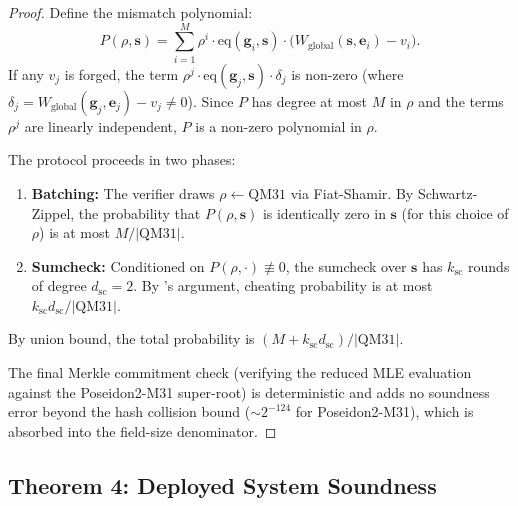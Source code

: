 \documentclass[10pt,twocolumn]{article}
\theoremstyle{definition}
\theoremstyle{remark}
\newcommand{\QM}{\mathrm{QM31}}
\newcommand{\eq}{\mathrm{eq}}
\begin{document}
\begin{proof}
  Define the mismatch polynomial:
  \[
    P(\rho, \mathbf{s}) = \sum_{i=1}^{M} \rho^i
    \cdot \eq(\mathbf{g}_i, \mathbf{s})
    \cdot \bigl(W_{\text{global}}(\mathbf{s}, \mathbf{e}_i)
    - v_i\bigr).
  \]
  If any $v_j$ is forged, the term $\rho^j \cdot
  \eq(\mathbf{g}_j, \mathbf{s}) \cdot \delta_j$ is non-zero
  (where $\delta_j = W_{\text{global}}(\mathbf{g}_j,
  \mathbf{e}_j) - v_j \ne 0$).
  Since $P$ has degree at most $M$ in $\rho$ and the terms
  $\rho^j$ are linearly independent, $P$ is a non-zero
  polynomial in $\rho$.

  The protocol proceeds in two phases:
  \begin{enumerate}[nosep,leftmargin=1.4em]
    \item \textbf{Batching:} The verifier draws
          $\rho \leftarrow \QM$ via Fiat-Shamir.
          By Schwartz-Zippel, the probability that $P(\rho,
          \mathbf{s})$ is identically zero in $\mathbf{s}$
          (for this choice of $\rho$) is at most $M/|\QM|$.
    \item \textbf{Sumcheck:} Conditioned on $P(\rho, \cdot)
          \not\equiv 0$, the sumcheck over $\mathbf{s}$ has
          $k_{\text{sc}}$ rounds of degree $d_{\text{sc}} = 2$.
          By 's argument, cheating
          probability is at most
          $k_{\text{sc}} d_{\text{sc}} / |\QM|$.
  \end{enumerate}
  By union bound, the total probability is
  $(M + k_{\text{sc}} d_{\text{sc}}) / |\QM|$.

  The final Merkle commitment check (verifying the reduced
  MLE evaluation against the Poseidon2-M31 super-root)
  is deterministic and adds no soundness error beyond
  the hash collision bound ($\sim 2^{-124}$ for
  Poseidon2-M31), which is absorbed into the field-size
  denominator.
\end{proof}

\subsection{Theorem 4: Deployed System Soundness}
\end{document}
